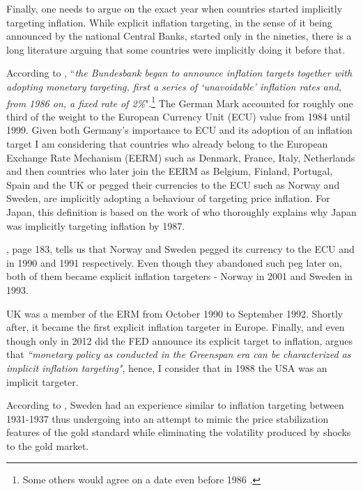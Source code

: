 \documentclass[12pt]{article}
\begin{document}
\begin{appendices}

Finally, one needs to argue on the exact year when countries started implicitly targeting inflation. While explicit inflation targeting, in the sense of it being announced by the national Central Banks, started only in the nineties, there is a long literature arguing that some countries were implicitly doing it before that.

According to \cite{vonHagen1999}, ``\textit{the Bundesbank began to announce inflation targets together with adopting monetary targeting, first a series of `unavoidable’ inflation rates and, from 1986 on, a fixed rate of 2\%}".\footnote{Some others would agree on a date even before 1986 \cite{Mishkin2001}.} The German Mark accounted for roughly one third of the weight to the European Currency Unit (ECU) value from 1984 until 1999. Given both Germany's importance to ECU and its adoption of an inflation target I am considering that countries who already belong to the European Exchange Rate Mechanism (EERM) such as Denmark, France, Italy, Netherlands and then countries who later join the EERM as Belgium, Finland, Portugal, Spain and the UK or pegged their currencies to the ECU such as Norway and Sweden, are implicitly adopting a behaviour of targeting price inflation. For Japan, this definition is based on the work of \cite{Jinushi2000} who thoroughly explains why Japan was implicitly targeting inflation by 1987.

\cite{Ungerer1997}, page 183, tells us that Norway and Sweden pegged its currency to the ECU and in 1990 and 1991 respectively. Even though they abandoned such peg later on, both of them became explicit inflation targeters - Norway in 2001 and Sweden in 1993. 

UK was a member of the ERM from October 1990 to September 1992. Shortly after, it became the first explicit inflation targeter in Europe. Finally, and even though only in 2012 did the FED announce its explicit target to inflation, \cite{Goodfriend2004} argues that \textit{``monetary policy as conducted in the Greenspan era can be characterized as implicit inflation targeting"}, hence, I consider that in 1988 the USA was an implicit targeter.

According to \cite{Berg1999}, Sweden had an experience similar to inflation targeting between 1931-1937 thus undergoing into an attempt to mimic the price stabilization features of the gold standard while eliminating the volatility produced by shocks to the gold market.


\end{appendices}
\end{document}
